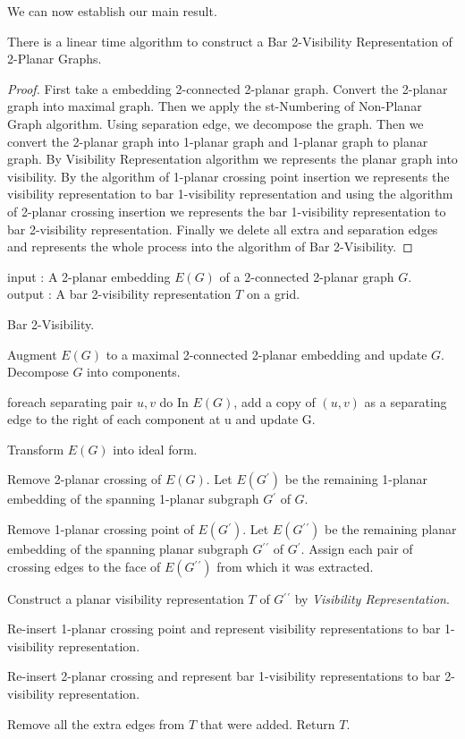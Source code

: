 We can now establish our main result.
\begin{theorem}
There is a linear time algorithm to construct a Bar 2-Visibility Representation of 2-Planar Graphs.
\end{theorem}
\begin{proof}
First take a embedding 2-connected 2-planar graph. Convert the 2-planar graph into maximal graph. Then we apply the st-Numbering of Non-Planar Graph algorithm. Using separation edge, we decompose the graph. Then we convert the 2-planar graph into 1-planar graph and 1-planar graph to planar graph. By Visibility Representation algorithm we represents the planar graph into visibility. By the algorithm of 1-planar crossing point insertion we represents the visibility representation to bar 1-visibility representation and using the algorithm of 2-planar crossing insertion we represents the bar 1-visibility representation to bar 2-visibility representation. Finally we delete all extra and separation edges and represents the whole process into the algorithm of Bar 2-Visibility.
\end{proof}

\begin{algorithm}[H] 
input : {A 2-planar embedding $E(G)$ of a 2-connected 2-planar graph $G$. } \\
output : {A bar 2-visibility representation $T$ on a grid.}
\caption{Bar 2-Visibility.}
\label{b2vr}
\begin{algorithmic}[1] 
\STATE Augment $E(G)$ to a maximal 2-connected 2-planar embedding and update $G$.
\STATE Decompose $G$ into components.

\STATE foreach separating pair ${u, v}$ do
\STATE In $E(G)$, add a copy of $(u, v)$ as a separating edge to the right of each
 component at u and update G.

\STATE Transform $E(G)$ into ideal form.

\STATE Remove 2-planar crossing of $E(G)$. Let $E(G{^\prime})$ be the remaining 1-planar embedding of the spanning 1-planar subgraph $G{^\prime}$ of $G$.

\STATE Remove 1-planar crossing point of $E(G{^\prime})$. Let $E(G{^\prime}{^\prime})$ be the remaining planar embedding of the spanning planar subgraph $G{^\prime}{^\prime}$ of $G{^\prime}$. Assign each pair of crossing edges to the face of $E(G{^\prime}{^\prime})$ from which it was extracted.


\STATE Construct a planar visibility representation $T$ of $G{^\prime}{^\prime}$ by
\emph{Visibility Representation}.


\STATE Re-insert 1-planar crossing point and represent visibility representations to bar 1-visibility representation.



\STATE Re-insert 2-planar crossing and represent bar 1-visibility representations to bar 2-visibility representation.


\STATE Remove all the extra edges from $T$ that were added.
\STATE Return $T$.


\end{algorithmic}
\end{algorithm}


